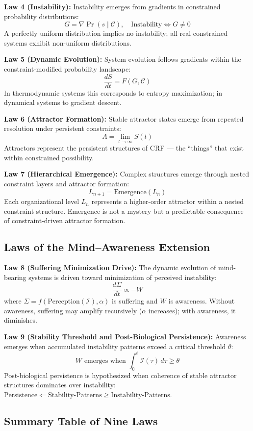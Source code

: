 \documentclass[12pt, a4paper]{article}
\begin{document}
\textbf{Law 4 (Instability):} Instability emerges from gradients in constrained probability
distributions:
\[ G = \nabla\Pr(s\mid\mathcal{C}), \quad \text{Instability} \Leftrightarrow G \neq 0 \]
A perfectly uniform distribution implies no instability; all real constrained systems
exhibit non-uniform distributions.

\textbf{Law 5 (Dynamic Evolution):} System evolution follows gradients within the
constraint-modified probability landscape:
\[ \frac{dS}{dt} = F(G, \mathcal{C}) \]
In thermodynamic systems this corresponds to entropy maximization; in dynamical systems
to gradient descent.

\textbf{Law 6 (Attractor Formation):} Stable attractor states emerge from repeated
resolution under persistent constraints:
\[ A = \lim_{t\to\infty} S(t) \]
Attractors represent the persistent structures of CRF --- the ``things'' that exist
within constrained possibility.

\textbf{Law 7 (Hierarchical Emergence):} Complex structures emerge through nested
constraint layers and attractor formation:
\[ L_{n+1} = \mathrm{Emergence}(L_n) \]
Each organizational level $L_n$ represents a higher-order attractor within a nested
constraint structure. Emergence is not a mystery but a predictable consequence of
constraint-driven attractor formation.

\subsection{Laws of the Mind--Awareness Extension}

\textbf{Law 8 (Suffering Minimization Drive):} The dynamic evolution of mind-bearing
systems is driven toward minimization of perceived instability:
\[ \frac{d\Sigma}{dt} \propto -W \]
where $\Sigma = f(\mathrm{Perception}(\mathcal{I}), \alpha)$ is suffering and $W$ is
awareness. Without awareness, suffering may amplify recursively ($\alpha$ increases);
with awareness, it diminishes.

\textbf{Law 9 (Stability Threshold and Post-Biological Persistence):} Awareness emerges
when accumulated instability patterns exceed a critical threshold $\theta$:
\[ W \text{ emerges when } \int_0^t \mathcal{I}(\tau)\,d\tau \geq \theta \]
Post-biological persistence is hypothesized when coherence of stable attractor structures
dominates over instability: $\mathrm{Persistence} \Leftarrow \mathrm{Stability\text{-}Patterns}
\geq \mathrm{Instability\text{-}Patterns}$.

\subsection{Summary Table of Nine Laws}
\end{document}
